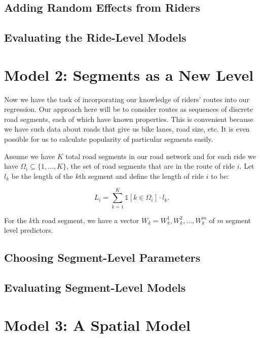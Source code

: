 \documentclass[12pt,twoside]{reedthesis}
\begin{document}
  \section{Adding Random Effects from Riders}\label{add-riders}
  
  \section{Evaluating the Ride-Level
  Models}\label{evaluating-the-ride-level-models}
  
  \chapter{Model 2: Segments as a New
  Level}\label{model-2-segments-as-a-new-level}
  
  Now we have the task of incorporating our knowledge of riders' routes
  into our regression. Our approach here will be to consider routes as
  sequences of discrete road segments, each of which have known
  properties. This is convenient because we have such data about roads
  that give us bike lanes, road size, etc. It is even possible for us to
  calculate popularity of particular segments easily.
  
  Assume we have \(K\) total road segments in our road network and for
  each ride we have \(\Omega_i \subseteq \{1, \ldots, K\}\), the set of
  road segments that are in the route of ride \(i\). Let \(l_k\) be the
  length of the \(k\)th segment and define the length of ride \(i\) to be:
  
  \[ L_i = \sum_{k = 1}^K \mathds{1} \left[k \in \Omega_i \right] \cdot l_k.\]
  
  For the \(k\)th road segment, we have a vector
  \(W_k = W_k^1, W_k^2, \ldots, W_k^m\) of \(m\) segment level predictors.
  
  \section{Choosing Segment-Level
  Parameters}\label{choosing-segment-level-parameters}
  
  \section{Evaluating Segment-Level
  Models}\label{evaluating-segment-level-models}
  
  \chapter{Model 3: A Spatial Model}\label{model-3-a-spatial-model}
  
\end{document}
